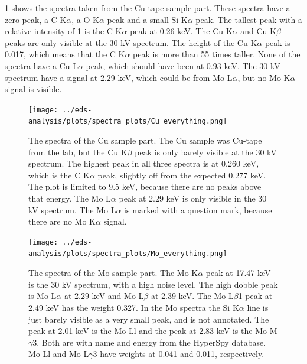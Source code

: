 \cref{fig:results:Spectra_Cu} shows the spectra taken from the Cu-tape sample part.
These spectra have a zero peak, a C K$\alpha$, a O K$\alpha$ peak and a small Si K$\alpha$ peak.
The tallest peak with a relative intensity of 1 is the C K$\alpha$ peak at 0.26 keV.
The Cu K$\alpha$ and Cu K$\beta$ peaks are only visible at the 30 kV spectrum.
The height of the Cu K$\alpha$ peak is 0.017, which means that the C K$\alpha$ peak is more than 55 times taller.
None of the spectra have a Cu L$\alpha$ peak, which should have been at 0.93 keV.
The 30 kV spectrum have a signal at 2.29 keV, which could be from Mo L$\alpha$, but no Mo K$\alpha$ signal is visible.

\begin{figure}[h]
    \centering
    \texttt{[image: ../eds-analysis/plots/spectra\_plots/Cu\_everything.png]}
    \caption{
        The spectra of the Cu sample part.
        The Cu sample was Cu-tape from the lab, but the Cu K$\beta$ peak is only barely visible at the 30 kV spectrum.
        The highest peak in all three spectra is at 0.260 keV, which is the C K$\alpha$ peak, slightly off from the expected 0.277 keV.
        The plot is limited to 9.5 keV, because there are no peaks above that energy.
        The Mo L$\alpha$ peak at 2.29 keV is only visible in the 30 kV spectrum.
        The Mo L$\alpha$ is marked with a question mark, because there are no Mo K$\alpha$ signal.
    }
    \label{fig:results:Spectra_Cu}
\end{figure}


\begin{figure}[h!]
    \centering
    \texttt{[image: ../eds-analysis/plots/spectra\_plots/Mo\_everything.png]}
    \caption{
        The spectra of the Mo sample part.
        The Mo K$\alpha$ peak at 17.47 keV is the 30 kV spectrum, with a high noise level.
        The high dobble peak is Mo L$\alpha$ at 2.29 keV and Mo L$\beta$ at 2.39 keV.
        The Mo L$\beta$1 peak at 2.49 keV has the weight 0.327.
        In the Mo spectra the Si K$\alpha$ line is just barely visible as a very small peak, and is not annotated.
        The peak at 2.01 keV is the Mo Ll and the peak at 2.83 keV is the Mo M$\gamma$3.
        Both are with name and energy from the HyperSpy database.
        Mo Ll and Mo L$\gamma$3 have weights at 0.041 and 0.011, respectively.
    }
    \label{fig:results:Spectra_Mo}
\end{figure}

